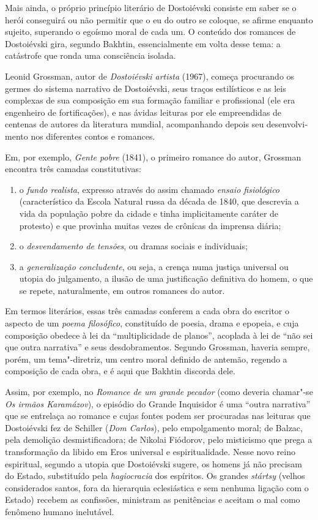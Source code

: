 Mais ainda, o próprio princípio literário de Dostoiévski consiste em
saber se o herói conseguirá ou não permitir que o eu do outro se
coloque, se afirme enquanto sujeito, superando o egoísmo moral de cada
um. O conteúdo dos romances de Dostoiévski gira, segundo Bakhtin,
essencialmente em volta desse tema: a catástrofe que ronda uma
consciência isolada.

Leonid Grossman, autor de \emph{Dostoiévski artista} (1967), começa
procurando os germes do sistema narrativo de Dostoiévski, seus traços
estilísticos e as leis complexas de sua composição em sua formação
familiar e profissional (ele era engenheiro de fortificações), e nas
ávidas leituras por ele empreendidas de centenas de autores da
literatura mundial, acompanhando depois seu desenvolvi­mento nos
diferentes contos e romances.

Em, por exemplo, \emph{Gente pobre} (1841), o primeiro romance do autor,
Grossman encontra três camadas constitutivas:

\begin{enumerate}
\item o \emph{fundo
realista}, expresso através do assim chamado \emph{ensaio fisiológico}
(característico da Escola Natural russa da década de 1840, que descrevia
a vida da população pobre da cidade e tinha implicitamente caráter de
protesto) e que provi­nha muitas vezes de crônicas da imprensa diária;
\item o \emph{desvendamento de tensões}, ou dramas sociais e individuais;
\item a \emph{generalização concludente}, ou seja, a crença numa justiça
universal ou utopia do julgamento, a ilusão de uma justificação
definitiva do homem, o que se repete, natural­mente, em outros romances
do autor.
\end{enumerate}

Em termos literários, essas três camadas confe­rem a cada obra do
escritor o aspecto de um \emph{poema filosófico}, constituído de poesia,
drama e epopeia, e cuja composição obedece à lei da ``multiplicidade de
planos'', acoplada à lei de ``não sei que outra narrativa'' e seus
desdobramentos. Segundo Grossman, haveria sempre, porém, um
tema"-diretriz, um centro moral definido de antemão, regendo a composição
de cada obra, e é aqui que Bakhtin discorda dele.

Assim, por exemplo, no \emph{Romance de um grande pecador} (como deveria
chamar"-se \emph{Os irmãos Karamázov}), o episódio do Grande
Inquisidor é uma ``outra narrativa'' que se entrelaça ao romance e cujas
fontes podem ser procuradas nas leituras que Dostoiévski fez de Schiller
(\emph{Dom Carlos}), pelo empolgamento moral; de Balzac, pela
demolição desmistificadora; de Nikolai Fiódorov, pelo misticismo que
prega a transformação da libido em Eros universal e espiritualidade.
Nesse novo reino espiritual, segundo a utopia que Dostoiévski sugere, os
homens já não precisam do Estado, substituído pela \emph{hagiocracia}
dos espíritos. Os grandes \emph{stártsy} (velhos considerados santos,
fora da hierarquia eclesiástica e sem nenhuma ligação com o Estado)
recebem as confissões, ministram as penitências e aceitam o mal como
fenômeno humano inelutável.

